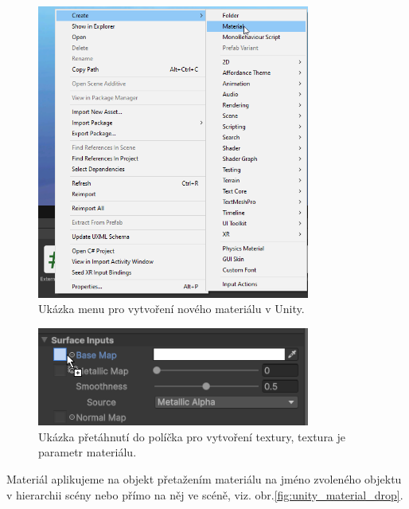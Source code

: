 \documentclass[a4paper,oneside,12pt]{book}
\begin{document}
\begin{figure}[H]
	\centering
	\includegraphics[width=0.8\textwidth]{obrazky/unity_material_create.png}
	\caption{Ukázka menu pro vytvoření nového materiálu v Unity.}
	\label{fig:unity_material_create}
\end{figure}

\begin{figure}[H]
	\centering
	\includegraphics[width=0.8\textwidth]{obrazky/unity_material_add_texture.png}
	\caption{Ukázka přetáhnutí do políčka pro vytvoření textury, textura je parametr materiálu.}
	\label{fig:unity_material_add_texture}
\end{figure}

 Materiál aplikujeme na objekt přetažením materiálu na jméno zvoleného objektu v hierarchii scény nebo přímo na něj ve scéně, viz. obr.\ref{fig:unity_material_drop}.
 
\end{document}
